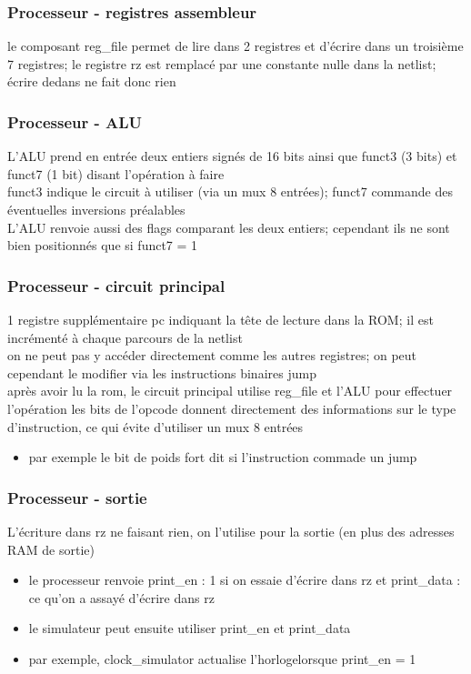 \documentclass[xcolor=pst,10pt,onlymath]{beamer}
\begin{document}
\begin{frame}
    \frametitle{Processeur - registres assembleur}
    le composant reg_file permet de lire dans 2 registres et d'écrire dans un troisième \\
    7 registres; le registre rz est remplacé par une constante nulle dans la netlist; 
        écrire dedans ne fait donc rien
\end{frame}

\begin{frame}
    \frametitle{Processeur - ALU}
    L'ALU prend en entrée deux entiers signés de 16 bits ainsi que funct3 (3 bits) et funct7 (1 bit) disant l'opération à faire \\
    funct3 indique le circuit à utiliser (via un mux 8 entrées); funct7 commande des éventuelles inversions préalables \\
    L'ALU renvoie aussi des flags comparant les deux entiers; cependant ils ne sont bien positionnés que si funct7 = 1
\end{frame}

\begin{frame}
    \frametitle{Processeur - circuit principal}
    1 registre supplémentaire pc indiquant la tête de lecture dans la ROM; il est incrémenté à chaque parcours de la netlist \\
    on ne peut pas y accéder directement comme les autres registres; on peut cependant le modifier via les instructions binaires jump \\
    après avoir lu la rom, le circuit principal utilise reg_file et l'ALU pour effectuer l'opération
    les bits de l'opcode donnent directement des informations sur le type d'instruction, ce qui évite d'utiliser un mux 8 entrées
    \begin{itemize}
        \item par exemple le bit de poids fort dit si l'instruction commade un jump
    \end{itemize}
\end{frame}

\begin{frame}
    \frametitle{Processeur - sortie}
    L'écriture dans rz ne faisant rien, on l'utilise pour la sortie (en plus des adresses RAM de sortie)
    \begin{itemize}
        \item le processeur renvoie print_en : 1 si on essaie d'écrire dans rz et print_data : ce qu'on a assayé d'écrire dans rz
        \item le simulateur peut ensuite utiliser print_en et print_data
        \item par exemple, clock_simulator actualise l'horlogelorsque print_en = 1
    \end{itemize}
\end{frame}
\end{document}
